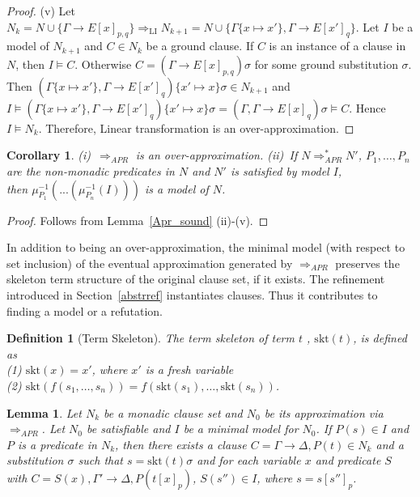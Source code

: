 \documentclass{llncs}
\newcommand{\imp}{\rightarrow}
\newcommand{\R}[1]{\mu^{-1}_{#1}}
\newcommand{\skt}{\text{skt}}
\newcommand{\apr}{ \Rightarrow_{APR}}
\newtheorem{defin}{Definition}
\newtheorem{lem}[theorem]{Lemma}
\newtheorem{cor}[theorem]{Corollary}
\begin{document}
\begin{proof}
(v)  Let $N_k =N\cup\{\Gamma \imp E[x]_{p,q}\} \Rightarrow_{\text{LI}} N_{k+1}=N\cup\{\Gamma\{x \mapsto x'\},\Gamma \imp E[x']_q\}$.
Let $I$ be a model of $N_{k+1}$ and $C\in N_k$ be a ground clause. 
If $C$ is an instance of a clause in $N$, then $I \models C$.
Otherwise $C = (\Gamma \imp E[x]_{p,q})\sigma$ for some ground substitution $\sigma$.
Then $(\Gamma\{x \mapsto x'\},\Gamma \imp E[x']_q)\{x' \mapsto x\}\sigma \in N_{k+1}$ and
$I \models (\Gamma\{x \mapsto x'\},\Gamma \imp E[x']_q)\{x' \mapsto x\}\sigma = (\Gamma,\Gamma \imp E[x]_q)\sigma \models C $.
Hence $I \models N_k$.
Therefore, Linear transformation is an over-approximation.
\end{proof}


\begin{cor}
(i)~$\apr$ is an over-approximation.
(ii)~If $N \apr^* N'$, $P_1,\dots,P_n$ are the non-monadic predicates in $N$ and $N'$ is satisfied by model $I$, \\
then  $\R{P_1}(...(\R{P_n}(I)))$  is a model of $N$.
\end{cor}
\begin{proof}
Follows from Lemma~\ref{Apr_sound} (ii)-(v).
\end{proof}

In addition to being an over-approximation, the minimal model (with respect to set inclusion)
 of the eventual approximation
generated by  $\apr$ preserves the skeleton term structure
of the original clause set, if it exists. The refinement introduced in Section~\ref{abstrref}
instantiates clauses. Thus it contributes to finding a model or a refutation.

\begin{defin}[Term Skeleton]\label{termSkel}
The term skeleton of term $t$ , $\skt(t)$, is defined as \\
(1) $\skt(x)=x'$, where $x'$ is a fresh variable \\
(2) $\skt(f(s_1,\dots,s_n))= f(\skt(s_1),\dots,\skt(s_n))$. 
\end{defin}


\begin{lem}\label{termSkelLem2}
Let $N_k$ be a monadic clause set and $N_0$ be its approximation via  $\apr$. 
Let $N_0$ be satisfiable and $I$ be a minimal model for $N_0$.
If $P(s) \in I$  and $P$ is a predicate in $N_k$, then there exists a clause 
$C = \Gamma \imp \Delta,P(t) \in N_k$ and a substitution $\sigma$ such that
$s = \skt(t)\sigma$ and for each variable $x$ and predicate $S$ with $C = S(x),\Gamma' \imp \Delta,P(t[x]_p)$, $S(s'') \in I$, where $s=s[s'']_p$.
\end{lem}
\end{document}
